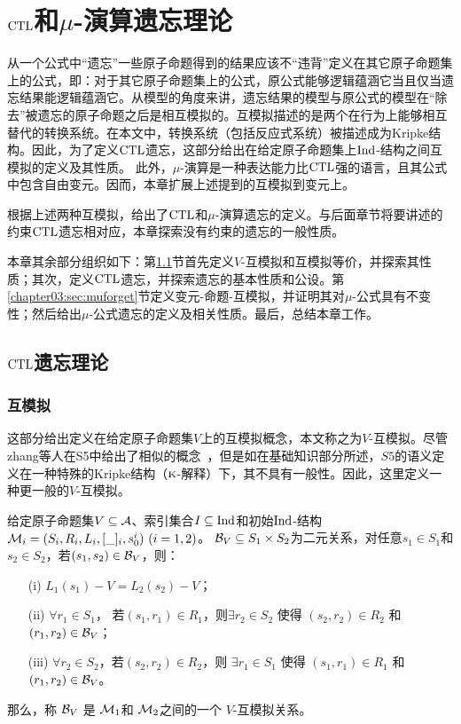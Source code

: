 
\chapter{$\textrm{CTL}$和$\mu$-演算遗忘理论}
\label{chapter03}
{\em 

从一个公式中“遗忘”一些原子命题得到的结果应该不“违背”定义在其它原子命题集上的公式，即：对于其它原子命题集上的公式，原公式能够逻辑蕴涵它当且仅当遗忘结果能逻辑蕴涵它。从模型的角度来讲，遗忘结果的模型与原公式的模型在“除去”被遗忘的原子命题之后是相互模拟的。互模拟描述的是两个在行为上能够相互替代的转换系统\cite{Baier:PMC:2008}。在本文中，转换系统（包括反应式系统）被描述成为Kripke结构。因此，为了定义$\textrm{CTL}$遗忘，这部分给出在给定原子命题集上$\textrm{Ind}$-结构之间互模拟的定义及其性质。
此外，$\mu$-演算是一种表达能力比$\textrm{CTL}$强的语言，且其公式中包含自由变元。因而，本章扩展上述提到的互模拟到变元上。

根据上述两种互模拟，给出了$\textrm{CTL}$和$\mu$-演算遗忘的定义。与后面章节将要讲述的约束$\textrm{CTL}$遗忘相对应，本章探索没有约束的遗忘的一般性质。

本章其余部分组织如下：第\ref{chapter03:sec:ctlforget}节首先定义$V$-互模拟和互模拟等价，并探索其性质；其次，定义$\textrm{CTL}$遗忘，并探索遗忘的基本性质和公设。第\ref{chapter03:sec:muforget}节定义变元-命题-互模拟，并证明其对$\mu$-公式具有不变性；然后给出$\mu$-公式遗忘的定义及相关性质。最后，总结本章工作。}

\section{$\textrm{CTL}$遗忘理论}
\label{chapter03:sec:ctlforget}

\subsection{互模拟}
这部分给出定义在给定原子命题集$V$上的互模拟概念，本文称之为$V$-互模拟。尽管zhang等人在S5中给出了相似的概念~\cite{Yan:AIJ:2009}，但是如在基础知识部分所述，$S5$的语义定义在一种特殊的Kripke结构（$\textsc{k}$-解释）下，其不具有一般性。因此，这里定义一种更一般的$V$-互模拟。


\begin{definition}[$V$-互模拟]
	\label{def:VInd:bisimulation}
	给定原子命题集$V\subseteq\cal A$、索引集合$I\subseteq \textrm{Ind}$和初始$\textrm{Ind}$-结构 ${\cal M}_i=(S_i, R_i,L_i, [\_]_i, s_0^i)~(i=1,2)$。
	${\cal B}_V \subseteq S_1 \times S_2$为二元关系，对任意$s_1 \in S_1$和$s_2 \in S_2$，若$(s_1, s_2)\in {\cal B}_V$，则：
	\begin{itemize}
		\item[(i)] $L_1(s_1) - V = L_2(s_2) -V$；
		\item[(ii)] $\forall r_1\in S_1$， 若$(s_1, r_1)\in R_1$，则$\exists r_2 \in S_2$ 使得 $(s_2,r_2) \in R_2$ 和 $(r_1, r_2) \in {\cal B}_V$；
		\item[(iii)] $\forall r_2\in S_2$，若$(s_2, r_2)\in R_2$，则 $\exists r_1 \in S_1$ 使得 $(s_1,r_1) \in R_1$ 和 $(r_1, r_2)\in {\cal B}_V$。
	\end{itemize}
那么，称 ${\cal B}_V$ 是 ${\cal M}_1$和 ${\cal M}_2$之间的一个 $V$-互模拟关系。
\end{definition}



